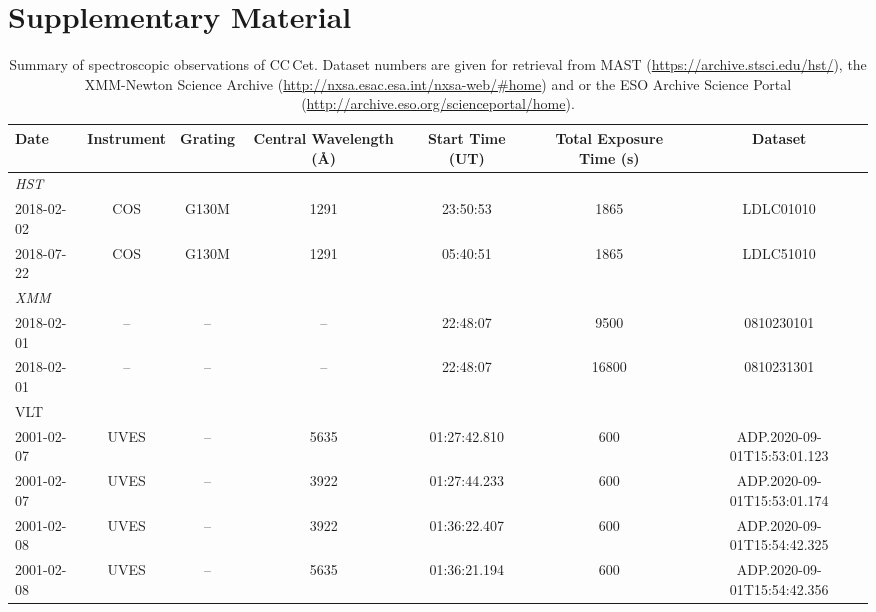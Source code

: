 \documentclass[fleqn,usenatbib]{mnras}
\begin{document}

\appendix
\section{Supplementary Material}

\begin{table}
\centering
\caption{Summary of spectroscopic observations of CC\,Cet. Dataset numbers are given for retrieval from MAST (\url{https://archive.stsci.edu/hst/}), the XMM-Newton Science Archive (\url{http://nxsa.esac.esa.int/nxsa-web/\#home}) and or the ESO Archive Science Portal (\url{http://archive.eso.org/scienceportal/home}).}  
\begin{tabular}{lcccccc}\\
\hline
Date & Instrument & Grating &  Central Wavelength (\AA) & Start Time (UT) & Total Exposure Time (s) & Dataset \\
\hline 
\textit{HST} & & & & & & \\
2018-02-02 & COS &	G130M &	1291 & 23:50:53 & 	1865 &	LDLC01010 \\
2018-07-22 & 	COS &	G130M &	1291	& 05:40:51 & 1865 &	LDLC51010\\
\textit{XMM} & & & & & & \\
2018-02-01 & -- & -- & -- & 22:48:07 & 9500 & 0810230101\\
2018-02-01 & -- & -- & -- & 22:48:07 & 16800 & 0810231301\\
VLT  & & & & & & \\
2001-02-07 & UVES & -- & 5635  & 01:27:42.810 & 600 & ADP.2020-09-01T15:53:01.123\\
2001-02-07 & UVES & -- & 3922 & 01:27:44.233 &600 & ADP.2020-09-01T15:53:01.174\\
2001-02-08 & UVES & -- & 3922 & 01:36:22.407 &600 & ADP.2020-09-01T15:54:42.325\\
2001-02-08 & UVES & -- & 5635 &01:36:21.194 & 600 & ADP.2020-09-01T15:54:42.356 \\
	


\hline

\hline
\end{tabular}
\label{tab:hst_obs}
\end{table}
\end{document}
